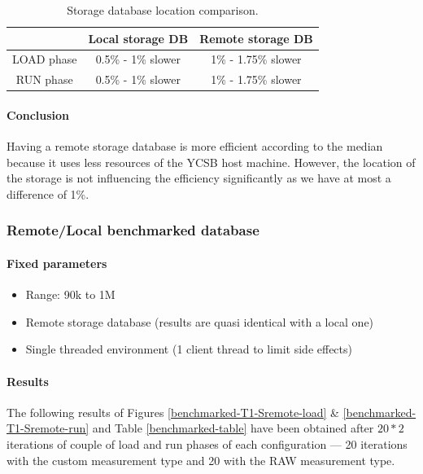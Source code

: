\documentclass[a4paper,11pt]{report}
\begin{document}
\begin{table}[ht]
\begin{center}
	\begin{tabular}{|c|c|c|}
		\hline
		  & Local storage DB & Remote storage DB \\
		\hline
	   	LOAD phase & 0.5\% - 1\% slower & 1\% - 1.75\% slower \\
	   	RUN phase & 0.5\% - 1\% slower & 1\% - 1.75\% slower \\
	    \hline
	\end{tabular}
	\caption{Storage database location comparison.}
\label{storage-table}
\end{center}
\end{table}


\paragraph{Conclusion}

Having a remote storage database is more efficient according to the median because it uses less resources of the YCSB host machine. However, the location of the storage is not influencing the efficiency significantly as we have at most a difference of 1\%.

\clearpage

\subsubsection{Remote/Local benchmarked database}\label{memcached_evaluation}

\paragraph{Fixed parameters}
\begin{itemize}
\item
Range: 90k to 1M
\item
Remote storage database (results are quasi identical with a local one)
\item
Single threaded environment (1 client thread to limit side effects)
\end{itemize}


\paragraph{Results}

The following results of Figures \ref{benchmarked-T1-Sremote-load}  \& \ref{benchmarked-T1-Sremote-run} and Table \ref{benchmarked-table} have been obtained after $20*2$ iterations of couple of load and run phases of each configuration --- 20 iterations with the custom measurement type and 20 with the RAW measurement type.
\end{document}
